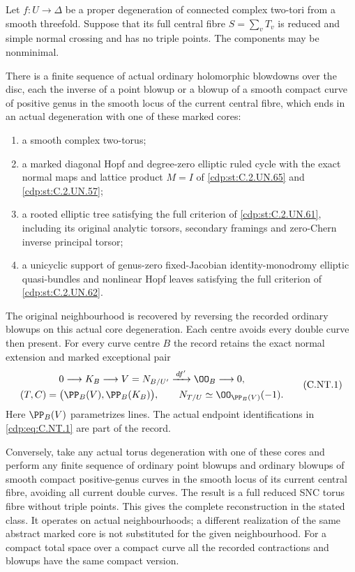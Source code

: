 
\begin{proposition}\label{cdp:st:C.2.UN.72}
Let $f:U\to\Delta$ be a proper degeneration of connected complex
two-tori from a smooth threefold. Suppose that its full central
fibre $S=\sum_vT_v$ is reduced and simple normal crossing and
has no triple points. The components may be nonminimal.

There is a finite sequence of actual ordinary holomorphic
blowdowns over the disc, each the inverse of a point blowup
or a blowup of a smooth compact curve of positive genus in
the smooth locus of the current central fibre, which ends
in an actual degeneration with one of these marked cores:
\begin{enumerate}
\item a smooth complex two-torus;
\item a marked diagonal Hopf and degree-zero elliptic ruled
cycle with the exact normal maps and lattice product $M=I$
of \ref{cdp:st:C.2.UN.65} and \ref{cdp:st:C.2.UN.57};
\item a rooted elliptic tree satisfying the full criterion
of \ref{cdp:st:C.2.UN.61}, including its original analytic torsors,
secondary framings and zero-Chern inverse principal torsor;
\item a unicyclic support of genus-zero fixed-Jacobian
identity-monodromy elliptic quasi-bundles and nonlinear
Hopf leaves satisfying the full criterion of \ref{cdp:st:C.2.UN.62}.
\end{enumerate}
The original neighbourhood is recovered by reversing the
recorded ordinary blowups on this actual core degeneration.
Each centre avoids every double curve then present.
For every curve centre $B$ the record retains the exact
normal extension and marked exceptional pair
\[
 \begin{gathered}
 0\longrightarrow K_B\longrightarrow V=N_{B/U'}
                 \xrightarrow{\,df'\,}\OO_B\longrightarrow0,\\
 (T,C)=\bigl(\PP_B(V),\PP_B(K_B)\bigr),\qquad
 N_{T/U}\simeq\OO_{\PP_B(V)}(-1).
 \end{gathered}
\tag{C.NT.1}\label{cdp:eq:C.NT.1}
\]
Here $\PP_B(V)$ parametrizes lines. The actual endpoint
identifications in \eqref{cdp:eq:C.NT.1} are part of the record.

Conversely, take any actual torus degeneration with one of
these cores and perform any finite sequence of ordinary
point blowups and ordinary blowups of smooth compact
positive-genus curves in the smooth locus of its current
central fibre, avoiding all current double curves. The
result is a full reduced SNC torus fibre without triple
points. This gives the complete reconstruction in the
stated class. It operates on actual neighbourhoods; a
different realization of the same abstract marked core
is not substituted for the given neighbourhood.
For a compact total space over a compact curve all the
recorded contractions and blowups have the same compact
version.


\end{proposition}
